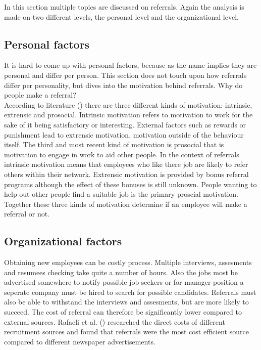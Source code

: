 \documentclass[Main.tex]{subfiles}
\begin{document}
In this section multiple topics are discussed on referrals. Again the analysis is made on two different levels, the personal level and the organizational level. 

\subsection*{Personal factors}

It is hard to come up with personal factors, because as the name implies they are personal and differ per person. This section does not touch upon how referrals differ per personality, but dives into the motivation behind referrals. Why do people make a referral? \\

According to literature (\cite{motives}) there are three different kinds of motivation: intrinsic, extrensic and prosocial. Intrinsic motivation refers to motivation to work for the sake of it being satisfactory or interesting. External factors such as rewards or punishment lead to extrensic motivation, motivation outside of the behaviour itself. The third and most recent kind of motivation is prosocial that is motivation to engage in work to aid other people. In the context of referrals intrinsic motivation means that employees who like there job are likely to refer others within their network. Extrensic motivation is provided by bonus referral programs although the effect of these bonuses is still unknown. People wanting to help out other people find a suitable job is the primary proscial motivation. Together these three kinds of motivation determine if an employee will make a referral or not.


\subsection*{Organizational factors}

Obtaining new employees can be costly process. Multiple interviews, assesments and resumees checking take quite a number of hours. Also the jobs most be advertised somewhere to notify possible job seekers or for manager position a seperate company must be hired to search for possible candidates. Referrals  must also be able to withstand the interviews and assesments, but are more likely to succeed. The cost of referral can therefore be significantly lower compared to external sources. Rafaeli et al. (\cite{fourth}) researched the direct costs of different recruitment sources and found that referrals were the most cost efficient source compared to different newspaper advertisements. \\
\end{document}
